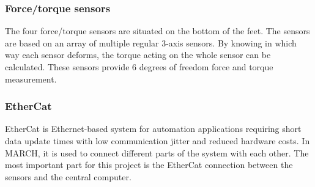 \subsubsection{Force/torque sensors}
The four force/torque sensors are situated on the bottom of the feet. The sensors are based on an array of multiple regular 3-axis sensors. By knowing in which way each sensor deforms, the torque acting on the whole sensor can be calculated. These sensors provide 6 degrees of freedom force and torque measurement.
\subsubsection{EtherCat}\label{sec:etherCat}
EtherCat is Ethernet-based system for automation applications requiring short data update times with low communication jitter and reduced hardware costs. In MARCH, it is used to connect different parts of the system with each other. The most important part for this project is the EtherCat connection between the sensors and the central computer. 


